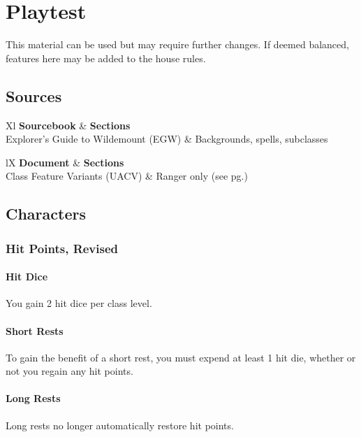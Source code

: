 \documentclass[House_Rules.tex]{subfiles}
\begin{document}
\chapter{Playtest}
This material can be used but may require further changes. If deemed balanced, features here may be added to the house rules.

\section{Sources}

\begin{DndTable}[header=Sourcebooks: Partial]{Xl}
    \textbf{Sourcebook} & \textbf{Sections} \\
    Explorer's Guide to Wildemount (EGW) & Backgrounds, spells, subclasses \\
\end{DndTable}

\begin{DndTable}[header=Unearthed Arcana]{lX}
    \textbf{Document} & \textbf{Sections} \\
    Class Feature Variants (UACV) & Ranger only (see pg.\pageref{variantRanger}) \\
\end{DndTable}

\section{Characters}

\subsection{Hit Points, Revised}

\subsubsection{Hit Dice}
You gain 2 hit dice per class level. 

\subsubsection{Short Rests}
To gain the benefit of a short rest, you must expend at least 1 hit die, whether or not you regain any hit points.

\subsubsection{Long Rests}
Long rests no longer automatically restore hit points.
\end{document}
